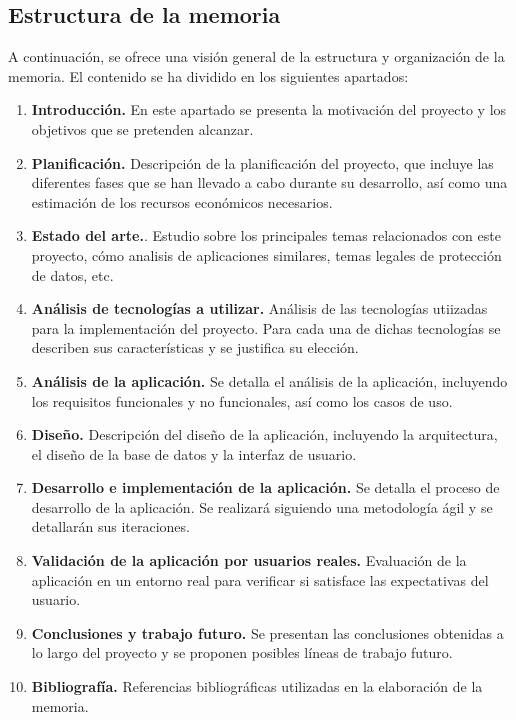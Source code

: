 \documentclass{article}
\begin{document}
\subsection{Estructura de la memoria}

A continuación, se ofrece una visión general de la estructura y organización de la memoria. El contenido se ha dividido en los siguientes apartados:

\begin{enumerate}
	\item \textbf{Introducción.} En este apartado se presenta la motivación del proyecto y los objetivos que se pretenden alcanzar.
	\item \textbf{Planificación.} Descripción de la planificación del proyecto, que incluye las diferentes fases que se han llevado a cabo durante su desarrollo, así como una estimación de los recursos económicos necesarios.
	\item \textbf{Estado del arte.}. Estudio sobre los principales temas relacionados con este proyecto, cómo analisis de aplicaciones similares, temas legales de protección de datos, etc.
	\item \textbf{Análisis de tecnologías a utilizar.} Análisis de las tecnologías utiizadas para la implementación del proyecto. Para cada una de dichas tecnologías se describen sus características y se justifica su elección.
	\item \textbf{Análisis de la aplicación.} Se detalla el análisis de la aplicación, incluyendo los requisitos funcionales y no funcionales, así como los casos de uso.
	\item \textbf{Diseño.} Descripción del diseño de la aplicación, incluyendo la arquitectura, el diseño de la base de datos y la interfaz de usuario.
	\item \textbf{Desarrollo e implementación de la aplicación.} Se detalla el proceso de desarrollo de la aplicación. Se realizará siguiendo una metodología ágil y se detallarán sus iteraciones.
	\item \textbf{Validación de la aplicación por usuarios reales.} Evaluación de la aplicación en un entorno real para verificar si satisface las expectativas del usuario.
	\item \textbf{Conclusiones y trabajo futuro.} Se presentan las conclusiones obtenidas a lo largo del proyecto y se proponen posibles líneas de trabajo futuro.
	\item \textbf{Bibliografía.} Referencias bibliográficas utilizadas en la elaboración de la memoria.

\end{enumerate}
\end{document}
